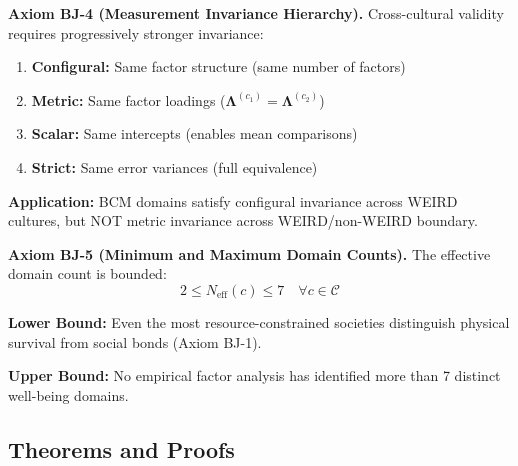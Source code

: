 \begin{tcolorbox}[colback=red!5!white, colframe=red!75!black, title=Axiom BJ-4: Factor Invariance Hierarchy]
\textbf{Axiom BJ-4 (Measurement Invariance Hierarchy).}
Cross-cultural validity requires progressively stronger invariance:
\begin{enumerate}[nosep]
\item \textbf{Configural:} Same factor structure (same number of factors)
\item \textbf{Metric:} Same factor loadings ($\boldsymbol{\Lambda}^{(c_1)} = \boldsymbol{\Lambda}^{(c_2)}$)
\item \textbf{Scalar:} Same intercepts (enables mean comparisons)
\item \textbf{Strict:} Same error variances (full equivalence)
\end{enumerate}

\textbf{Application:} BCM domains satisfy configural invariance across WEIRD cultures,
but NOT metric invariance across WEIRD/non-WEIRD boundary.
\end{tcolorbox}

\begin{tcolorbox}[colback=red!5!white, colframe=red!75!black, title=Axiom BJ-5: Domain Boundary Conditions]
\textbf{Axiom BJ-5 (Minimum and Maximum Domain Counts).}
The effective domain count is bounded:
\begin{equation}
2 \leq N_{\text{eff}}(c) \leq 7 \quad \forall c \in \mathcal{C}
\end{equation}

\textbf{Lower Bound:} Even the most resource-constrained societies distinguish physical survival
from social bonds (Axiom BJ-1).

\textbf{Upper Bound:} No empirical factor analysis has identified more than 7 distinct well-being domains.
\end{tcolorbox}

\subsection{Theorems and Proofs}

